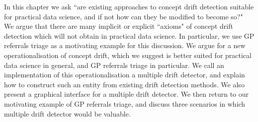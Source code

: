 In this chapter we ask ``are existing approaches to concept drift detection suitable for practical data science, and if not how can they be modified to become so?" We argue that there are many implicit or explicit ``axioms" of concept drift detection which will not obtain in practical data science. In particular, we use GP referrals triage as a motivating example for this discussion. We argue for a new operationalisation of concept drift, which we suggest is better suited for practical data science in general, and GP referrals triage in particular. We call an implementation of this operationalisation a multiple drift detector, and explain how to construct such an entity from existing drift detection methods. We also present a graphical interface for a multiple drift detector. We then return to our motivating example of GP referrals triage, and discuss three scenarios in which multiple drift detector would be valuable.
